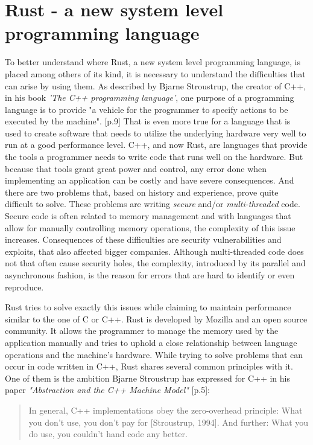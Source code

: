 \chapter{Rust - a new system level programming language}

To better understand where Rust, a new system level programming language, is placed among others of its kind, it is necessary to understand the difficulties that can arise by using them. As described by Bjarne Stroustrup, the creator of C++, in his book \textit{'The C++ programming language'}, one purpose of a programming language is to provide "a vehicle for the programmer to specify actions to be executed by the machine". \cite{C_Lan}[p.9] That is even more true for a language that is used to create software that needs to utilize the underlying hardware very well to run at a good performance level. C++, and now Rust, are languages that provide the tools a programmer needs to write code that runs well on the hardware. But because that tools grant great power and control, any error done when implementing an application can be costly and have severe consequences. And there are two problems that, based on history and experience, prove quite difficult to solve. These problems are writing \textit{secure} and/or \textit{multi-threaded} code.
Secure code is often related to memory management and with languages that allow for manually controlling memory operations, the complexity of this issue increases. Consequences of these difficulties are security vulnerabilities and exploits, that also affected bigger companies. Although multi-threaded code does not that often cause security holes, the complexity, introduced by its parallel and asynchronous fashion, is the reason for errors that are hard to identify or even reproduce.

Rust tries to solve exactly this issues while claiming to maintain performance similar to the one of C or C++. Rust is developed by Mozilla and an open source community. It allows the programmer to manage the memory used by the application manually and tries to uphold a close relationship between language operations and the machine's hardware. While trying to solve problems that can occur in code written in C++, Rust shares several common principles with it. One of them is the ambition Bjarne Stroustrup has expressed for C++ in his paper \textit{"Abstraction and the C++ Machine Model"} \cite{Stroustrup2005}[p.5]:

\begin{quote}
	In general, C++ implementations obey the zero-overhead principle: What you don’t use, you don’t pay for [Stroustrup, 1994]. And further: What you do use, you couldn’t hand code any better.
\end{quote}


